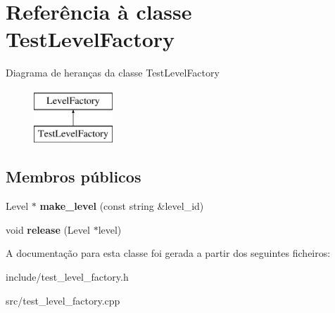 \hypertarget{classTestLevelFactory}{}\section{Referência à classe Test\+Level\+Factory}
\label{classTestLevelFactory}
Diagrama de heranças da classe Test\+Level\+Factory\begin{figure}[H]
\begin{center}
\leavevmode
\includegraphics[height=2.000000cm]{classTestLevelFactory}
\end{center}
\end{figure}
\subsection*{Membros públicos}
\begin{DoxyCompactItemize}
\item 
\mbox{\label{classTestLevelFactory_ab661866cd93b21b0fa16cfd72ace461e}} 
Level $\ast$ {\bfseries make\+\_\+level} (const string \&level\+\_\+id)
\item 
\mbox{\label{classTestLevelFactory_a7771c01184257df25680ba0c8f3b5188}} 
void {\bfseries release} (Level $\ast$level)
\end{DoxyCompactItemize}


A documentação para esta classe foi gerada a partir dos seguintes ficheiros\+:\begin{DoxyCompactItemize}
\item 
include/test\+\_\+level\+\_\+factory.\+h\item 
src/test\+\_\+level\+\_\+factory.\+cpp\end{DoxyCompactItemize}
